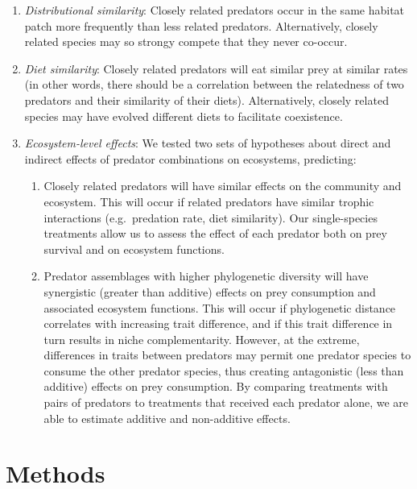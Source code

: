 \documentclass[11pt]{article}
\begin{document}
\begin{enumerate}
\def\labelenumi{\arabic{enumi}.}
\item
  \emph{Distributional similarity}: Closely related predators occur in
  the same habitat patch more frequently than less related predators.
  Alternatively, closely related species may so strongy compete that they never co-occur.
\item
  \emph{Diet similarity}: Closely related predators will eat similar
  prey at similar rates (in other words, there should be a correlation between the relatedness of two predators and their similarity of their diets). Alternatively, closely related species may have
  evolved different diets to facilitate coexistence.
\item
  \emph{Ecosystem-level effects}: We tested two sets of hypotheses about
  direct and indirect effects of predator combinations on ecosystems,
  predicting:

  \begin{enumerate}
  \def\labelenumii{(\alph{enumii})}
  \item
    Closely related predators will have similar effects on the
    community and ecosystem. This will occur if related predators have similar trophic
    interactions (e.g.~predation rate, diet similarity). Our
    single-species treatments allow us to assess the effect of each
    predator both on prey survival and on ecosystem functions.
  \item
    Predator assemblages with higher phylogenetic diversity will have
    synergistic (greater than additive) effects on prey consumption and
    associated ecosystem functions. This will occur if phylogenetic
    distance correlates with increasing trait difference, and if this
    trait difference in turn results in niche complementarity. However,
    at the extreme, differences in traits between predators may permit one predator species to consume the other predator species, thus
    creating antagonistic (less than additive) effects on prey
    consumption. By comparing treatments with pairs of predators to
    treatments that received each predator alone, we are able to
    estimate additive and non-additive effects.
  \end{enumerate}
\end{enumerate}


\section*{Methods}
\end{document}
